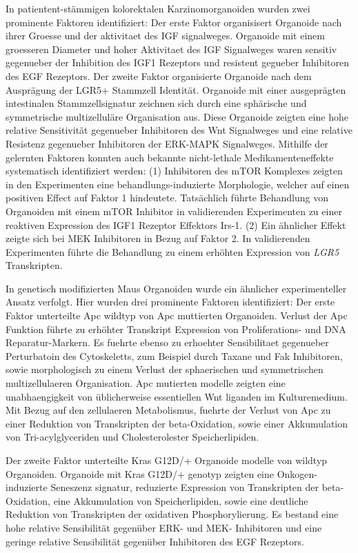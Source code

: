 In patientent-stämmigen kolorektalen Karzinomorganoiden wurden zwei prominente Faktoren identifiziert: Der erste Faktor organisisert Organoide nach ihrer Groesse und der aktivitaet des IGF signalweges. Organoide mit einem groesseren Diameter und hoher Aktivitaet des IGF Signalweges waren sensitiv gegenueber der Inhibition des IGF1 Rezeptors und resistent gegueber Inhibitoren des EGF Rezeptors. 
\smallbreak
Der zweite Faktor organisierte Organoide nach dem Ausprägung der LGR5+ Stammzell Identität. Organoide mit einer ausgeprägten intestinalen Stammzellsignatur zeichnen sich durch eine sphärische und symmetrische multizelluläre Organisation aus. Diese Organoide zeigten eine hohe relative Sensitivität gegenueber Inhibitoren des Wnt Signalweges und eine relative Resistenz gegenueber Inhibitoren der ERK-MAPK Signalweges. 
\smallbreak
Mithilfe der gelernten Faktoren konnten auch bekannte nicht-lethale Medikamenteneffekte systematisch identifiziert werden: (1) Inhibitoren des mTOR Komplexes zeigten in den Experimenten eine behandlungs-induzierte Morphologie, welcher auf einen positiven Effect auf Faktor 1 hindeutete. Tatsächlich führte Behandlung von Organoiden mit einem mTOR Inhibitor in validierenden Experimenten zu einer reaktiven Expression des IGF1 Rezeptor Effektors Irs-1. (2) Ein ähnlicher Effekt zeigte sich bei MEK Inhibitoren in Bezug auf Faktor 2. In validierenden Experimenten führte die Behandlung zu einem erhöhten Expression von \textit{LGR5} Transkripten.
\bigbreak

In genetisch modifizierten Maus Organoiden wurde ein ähnlicher experimenteller Ansatz verfolgt. Hier wurden drei prominente Faktoren identifiziert: Der erste Faktor unterteilte Apc wildtyp von Apc muttierten Organoiden. Verlust der Apc Funktion führte zu erhöhter Transkript Expression von Proliferations- und DNA Reparatur-Markern. Es fuehrte ebenso zu erhoehter Sensibilitaet gegenueber Perturbatoin des Cytoskeletts, zum Beispiel durch Taxane und Fak Inhibitoren, sowie morphologisch zu einem Verlust der sphaerischen und symmetrischen multizellulaeren Organisation. Apc mutierten modelle zeigten eine unabhaengigkeit von üblicherweise essentiellen Wnt liganden im Kulturemedium. Mit Bezug auf den zellulaeren Metabolismus, fuehrte der Verlust von Apc zu einer Reduktion von Transkripten der beta-Oxidation, sowie einer Akkumulation von Tri-acylglyceriden und Cholesterolester Speicherlipiden.
\bigbreak

Der zweite Faktor unterteilte Kras G12D/+ Organoide modelle von wildtyp Organoiden. Organoide mit Kras G12D/+ genotyp zeigten eine Onkogen-induzierte Seneszenz signatur, reduzierte  Expression von Transkripten der beta-Oxidation, eine Akkumulation von Speicherlipiden, sowie eine deutliche Reduktion von Transkripten der oxidativen Phosphorylierung. Es bestand eine hohe relative Sensibilität gegenüber ERK- und MEK- Inhibitoren und eine geringe relative Sensibilität gegenüber Inhibitoren des EGF Rezeptors. 
\bigbreak


